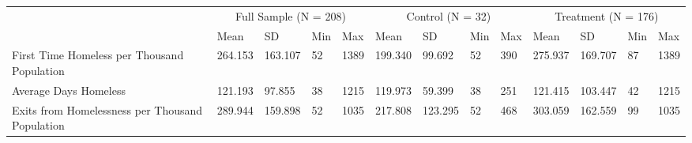 \begin{tabular}{lllllllllllll}
\toprule
 & \multicolumn{4}{c}{Full Sample (N = 208)} & \multicolumn{4}{c}{Control (N = 32)} & \multicolumn{4}{c}{Treatment (N = 176)} \\
 & Mean & SD & Min & Max & Mean & SD & Min & Max & Mean & SD & Min & Max \\
\midrule
First Time Homeless per Thousand Population & 264.153 & 163.107 & 52 & 1389 & 199.340 & 99.692 & 52 & 390 & 275.937 & 169.707 & 87 & 1389 \\
Average Days Homeless & 121.193 & 97.855 & 38 & 1215 & 119.973 & 59.399 & 38 & 251 & 121.415 & 103.447 & 42 & 1215 \\
Exits from Homelessness per Thousand Population & 289.944 & 159.898 & 52 & 1035 & 217.808 & 123.295 & 52 & 468 & 303.059 & 162.559 & 99 & 1035 \\
\bottomrule
\end{tabular}
